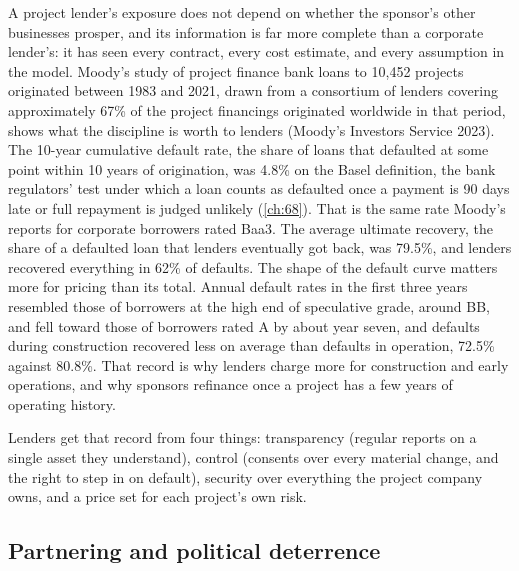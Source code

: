 A project lender's exposure does not depend on whether the sponsor's other businesses prosper, and its information is far more complete than a corporate lender's: it has seen every contract, every cost estimate, and every assumption in the model. Moody's study of project finance bank loans to 10,452 projects originated between 1983 and 2021, drawn from a consortium of lenders covering approximately 67\% of the project financings originated worldwide in that period, shows what the discipline is worth to lenders (Moody's Investors Service 2023). The 10-year cumulative default rate, the share of loans that defaulted at some point within 10 years of origination, was 4.8\% on the Basel definition, the bank regulators' test under which a loan counts as defaulted once a payment is 90 days late or full repayment is judged unlikely (\cref{ch:68}). That is the same rate Moody's reports for corporate borrowers rated Baa3. The average ultimate recovery, the share of a defaulted loan that lenders eventually got back, was 79.5\%, and lenders recovered everything in 62\% of defaults. The shape of the default curve matters more for pricing than its total. Annual default rates in the first three years resembled those of borrowers at the high end of speculative grade, around BB, and fell toward those of borrowers rated A by about year seven, and defaults during construction recovered less on average than defaults in operation, 72.5\% against 80.8\%. That record is why lenders charge more for construction and early operations, and why sponsors refinance once a project has a few years of operating history.

Lenders get that record from four things: transparency (regular reports on a single asset they understand), control (consents over every material change, and the right to step in on default), security over everything the project company owns, and a price set for each project's own risk.

\subsection{Partnering and political deterrence}\label{ssec:2.5.3}

